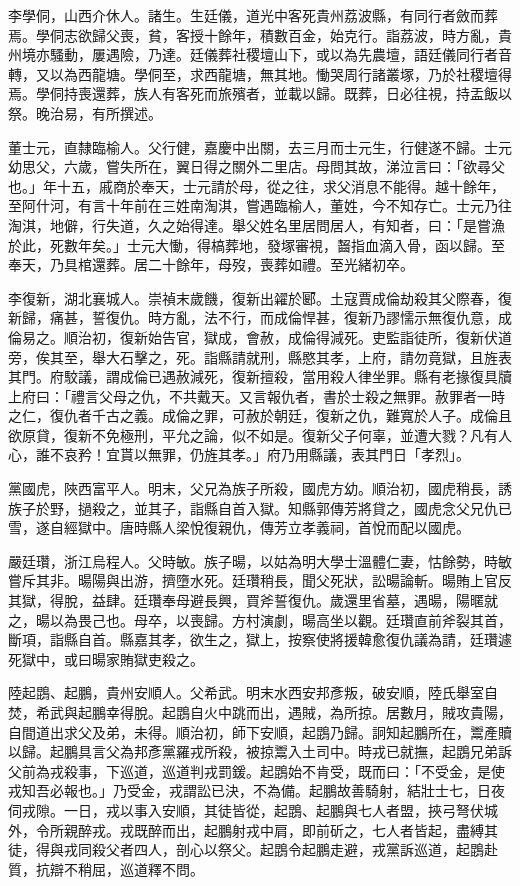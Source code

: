 \begin{pinyinscope}
李學侗，山西介休人。諸生。生廷儀，道光中客死貴州荔波縣，有同行者斂而葬焉。學侗志欲歸父喪，貧，客授十餘年，積數百金，始克行。詣荔波，時方亂，貴州境亦騷動，屢遇險，乃達。廷儀葬社稷壇山下，或以為先農壇，語廷儀同行者音轉，又以為西龍塘。學侗至，求西龍塘，無其地。慟哭周行諸叢塚，乃於社稷壇得焉。學侗持喪還葬，族人有客死而旅殯者，並載以歸。既葬，日必往視，持盂飯以祭。晚治易，有所撰述。

董士元，直隸臨榆人。父行健，嘉慶中出關，去三月而士元生，行健遂不歸。士元幼思父，六歲，嘗失所在，翼日得之關外二里店。母問其故，涕泣言曰：「欲尋父也。」年十五，戚商於奉天，士元請於母，從之往，求父消息不能得。越十餘年，至阿什河，有言十年前在三姓南淘淇，嘗遇臨榆人，董姓，今不知存亡。士元乃往淘淇，地僻，行失道，久之始得達。舉父姓名里居問居人，有知者，曰：「是嘗漁於此，死數年矣。」士元大慟，得槁葬地，發塚審視，齧指血滴入骨，函以歸。至奉天，乃具棺還葬。居二十餘年，母歿，喪葬如禮。至光緒初卒。

李復新，湖北襄城人。崇禎末歲饑，復新出糴於郾。土寇賈成倫劫殺其父際春，復新歸，痛甚，誓復仇。時方亂，法不行，而成倫悍甚，復新乃謬懦示無復仇意，成倫易之。順治初，復新始告官，獄成，會赦，成倫得減死。吏監詣徒所，復新伏道旁，俟其至，舉大石擊之，死。詣縣請就刑，縣愍其孝，上府，請勿竟獄，且旌表其門。府駮議，謂成倫已遇赦減死，復新擅殺，當用殺人律坐罪。縣有老掾復具牘上府曰：「禮言父母之仇，不共戴天。又言報仇者，書於士殺之無罪。赦罪者一時之仁，復仇者千古之義。成倫之罪，可赦於朝廷，復新之仇，難寬於人子。成倫且欲原貸，復新不免極刑，平允之論，似不如是。復新父子何辜，並遭大戮？凡有人心，誰不哀矜！宜貰以無罪，仍旌其孝。」府乃用縣議，表其門日「孝烈」。

黨國虎，陜西富平人。明末，父兄為族子所殺，國虎方幼。順治初，國虎稍長，誘族子於野，撾殺之，並其子，詣縣自首入獄。知縣郭傳芳將貸之，國虎念父兄仇已雪，遂自經獄中。唐時縣人梁悅復親仇，傳芳立孝義祠，首悅而配以國虎。

嚴廷瓚，浙江烏程人。父時敏。族子暘，以姑為明大學士溫體仁妻，怙餘勢，時敏嘗斥其非。暘陽與出游，擠墮水死。廷瓚稍長，聞父死狀，訟暘論斬。暘賄上官反其獄，得脫，益肆。廷瓚奉母避長興，買斧誓復仇。歲還里省墓，遇暘，陽暱就之，暘以為畏己也。母卒，以喪歸。方村演劇，暘高坐以觀。廷瓚直前斧裂其首，斷項，詣縣自首。縣嘉其孝，欲生之，獄上，按察使將援韓愈復仇議為請，廷瓚遽死獄中，或曰暘家賄獄吏殺之。

陸起鵾、起鵬，貴州安順人。父希武。明末水西安邦彥叛，破安順，陸氏舉室自焚，希武與起鵬幸得脫。起鵾自火中跳而出，遇賊，為所掠。居數月，賊攻貴陽，自間道出求父及弟，未得。順治初，師下安順，起鵾乃歸。詗知起鵬所在，鬻產贖以歸。起鵬具言父為邦彥黨羅戎所殺，被掠鬻入土司中。時戎已就撫，起鵾兄弟訴父前為戎殺事，下巡道，巡道判戎罰鍰。起鵾始不肯受，既而曰：「不受金，是使戎知吾必報也。」乃受金，戎謂訟已決，不為備。起鵬故善騎射，結壯士七，日夜伺戎隙。一日，戎以事入安順，其徒皆從，起鵾、起鵬與七人者盟，挾弓弩伏城外，令所親醉戎。戎既醉而出，起鵬射戎中肩，即前斫之，七人者皆起，盡縛其徒，得與戎同殺父者四人，剖心以祭父。起鵾令起鵬走避，戎黨訴巡道，起鵾赴質，抗辯不稍屈，巡道釋不問。


\end{pinyinscope}

